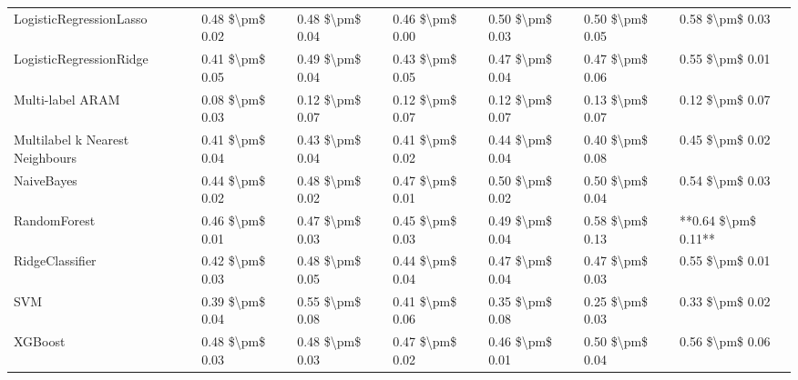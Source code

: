 \begin{tabular}{lllllll}
LogisticRegressionLasso         &  0.48 \$\textbackslash pm\$ 0.02 &           0.48 \$\textbackslash pm\$ 0.04 &       0.46 \$\textbackslash pm\$ 0.00 &        0.50 \$\textbackslash pm\$ 0.03 &                         0.50 \$\textbackslash pm\$ 0.05 &      0.58 \$\textbackslash pm\$ 0.03 \\
LogisticRegressionRidge         &  0.41 \$\textbackslash pm\$ 0.05 &           0.49 \$\textbackslash pm\$ 0.04 &       0.43 \$\textbackslash pm\$ 0.05 &        0.47 \$\textbackslash pm\$ 0.04 &                         0.47 \$\textbackslash pm\$ 0.06 &      0.55 \$\textbackslash pm\$ 0.01 \\
Multi-label ARAM                &  0.08 \$\textbackslash pm\$ 0.03 &           0.12 \$\textbackslash pm\$ 0.07 &       0.12 \$\textbackslash pm\$ 0.07 &        0.12 \$\textbackslash pm\$ 0.07 &                         0.13 \$\textbackslash pm\$ 0.07 &      0.12 \$\textbackslash pm\$ 0.07 \\
Multilabel k Nearest Neighbours &  0.41 \$\textbackslash pm\$ 0.04 &           0.43 \$\textbackslash pm\$ 0.04 &       0.41 \$\textbackslash pm\$ 0.02 &        0.44 \$\textbackslash pm\$ 0.04 &                         0.40 \$\textbackslash pm\$ 0.08 &      0.45 \$\textbackslash pm\$ 0.02 \\
NaiveBayes                      &  0.44 \$\textbackslash pm\$ 0.02 &           0.48 \$\textbackslash pm\$ 0.02 &       0.47 \$\textbackslash pm\$ 0.01 &        0.50 \$\textbackslash pm\$ 0.02 &                         0.50 \$\textbackslash pm\$ 0.04 &      0.54 \$\textbackslash pm\$ 0.03 \\
RandomForest                    &  0.46 \$\textbackslash pm\$ 0.01 &           0.47 \$\textbackslash pm\$ 0.03 &       0.45 \$\textbackslash pm\$ 0.03 &        0.49 \$\textbackslash pm\$ 0.04 &                         0.58 \$\textbackslash pm\$ 0.13 &  **0.64 \$\textbackslash pm\$ 0.11** \\
RidgeClassifier                 &  0.42 \$\textbackslash pm\$ 0.03 &           0.48 \$\textbackslash pm\$ 0.05 &       0.44 \$\textbackslash pm\$ 0.04 &        0.47 \$\textbackslash pm\$ 0.04 &                         0.47 \$\textbackslash pm\$ 0.03 &      0.55 \$\textbackslash pm\$ 0.01 \\
SVM                             &  0.39 \$\textbackslash pm\$ 0.04 &           0.55 \$\textbackslash pm\$ 0.08 &       0.41 \$\textbackslash pm\$ 0.06 &        0.35 \$\textbackslash pm\$ 0.08 &                         0.25 \$\textbackslash pm\$ 0.03 &      0.33 \$\textbackslash pm\$ 0.02 \\
XGBoost                         &  0.48 \$\textbackslash pm\$ 0.03 &           0.48 \$\textbackslash pm\$ 0.03 &       0.47 \$\textbackslash pm\$ 0.02 &        0.46 \$\textbackslash pm\$ 0.01 &                         0.50 \$\textbackslash pm\$ 0.04 &      0.56 \$\textbackslash pm\$ 0.06 \\
\bottomrule
\end{tabular}

